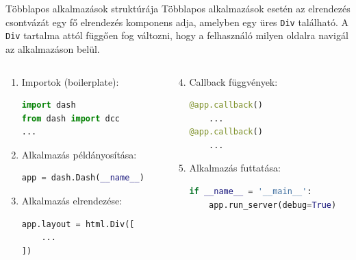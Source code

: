 \documentclass[english, aspectratio=169]{beamer}
\begin{document}
	\begin{frame}[fragile]{Többlapos alkalmazások struktúrája}
		Többlapos alkalmazások esetén az elrendezés csontvázát egy fő elrendezés komponens adja, amelyben egy üres \texttt{Div} található. A \texttt{Div} tartalma attól függően fog változni, hogy a felhasználó milyen oldalra navigál az alkalmazáson belül. 
		\begin{columns}
			\begin{column}{.5\textwidth}
				\begin{enumerate}
					\item Importok (boilerplate):
						\begin{lstlisting}[language=python]
import dash
from dash import dcc
...
						\end{lstlisting}
					\item Alkalmazás példányosítása:
						\begin{lstlisting}[language=python]
app = dash.Dash(__name__)
						\end{lstlisting}
					\item Alkalmazás elrendezése:
						\begin{lstlisting}[language=python]
app.layout = html.Div([
	...
])
						\end{lstlisting}
				\end{enumerate}			
			\end{column}
			\begin{column}{.5\textwidth}
				\begin{enumerate}
					\setcounter{enumi}{3}
					\item Callback függvények:
						\begin{lstlisting}[language=python]
@app.callback()
	...
@app.callback()
	...
						\end{lstlisting}
					\item Alkalmazás futtatása:
						\begin{lstlisting}[language=python]
if __name__ = '__main__':
	app.run_server(debug=True)
						\end{lstlisting}
				\end{enumerate}
			\end{column}
		\end{columns}
	\end{frame}
	
\end{document}
